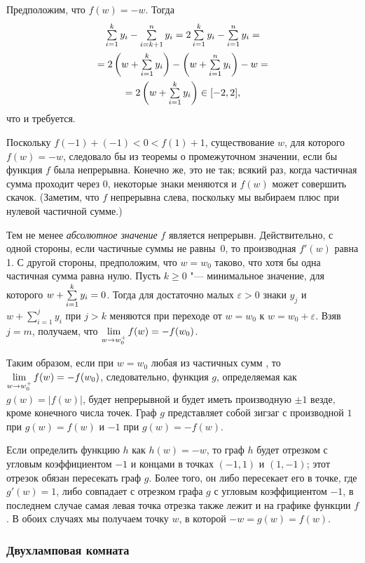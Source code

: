 \documentclass[twoside]{book}
\begin{document}
Предположим, что $f(w)=-w$.
Тогда
\begin{multline*}
\mathop{\textstyle\sum}\limits_{i=1}^{k}y_i-\mathop{\textstyle\sum}\limits_{i=k+1}^{n}y_i=
2\mathop{\textstyle\sum}\limits_{i=1}^{k}y_i-\mathop{\textstyle\sum}\limits_{i=1}^{n}y_i=\\=
2\left(w+\mathop{\textstyle\sum}\limits_{i=1}^{k}y_i\right)-\left(w+\mathop{\textstyle\sum}\limits_{i=1}^{n}y_i\right)-w=\\=
2\left(w+\mathop{\textstyle\sum}\limits_{i=1}^{k}y_i\right)\in[-2,2],
\end{multline*}
что и требуется.

Поскольку $f(-1)+(-1)<0<f(1)+1$, существование $w$, для которого $f(w)=-w$, следовало бы из теоремы о промежуточном значении, если бы функция $f$ была непрерывна.
Конечно же, это не так; всякий раз, когда частичная сумма проходит через 0, некоторые знаки меняются и $f(w)$ может совершить скачок.
(Заметим, что $f$ непрерывна слева, поскольку мы выбираем плюс при нулевой частичной сумме.)

Тем не менее \emph{абсолютное значение} $f$ является непрерывн.
Действительно, с одной стороны, если частичные суммы не равны~$0$, то производная $f'(w)$ равна 1.
С другой стороны, предположим, что $w=w_0$ таково, что хотя бы одна частичная сумма равна нулю.
Пусть $k\ge0$ "--- минимальное значение, для которого $w+\sum\limits_{i=1}^{k}y_i\z=0$.
Тогда для достаточно малых $\varepsilon>0$
знаки  $y_j$ и $w+\sum\limits_{i=1}^{j}y_i$ при $j>k$ меняются при переходе от $w=w_0$ к $w=w_0+\varepsilon$.
Взяв $j = m$, получаем, что $\lim\limits_{w\to w_0^+}f(w)\z=-f(w_0)$.

Таким образом, если при $w=w_0$ любая из частичных сумм , то $\lim\limits_{w\to w_0^+}f(w)\z=-f(w_0)$, следовательно, функция $g$, определяемая как $g(w) =|f(w)|$, будет непрерывной и будет иметь производную $\pm1$ везде, кроме конечного числа точек.
Граф $g$ представляет собой зигзаг с производной $1$ при $g(w)=f(w)$ и $-1$ при $g(w)=-f(w)$.

Если определить функцию $h$ как $h (w) = -w$, то граф $h$ будет отрезком с угловым коэффициентом $-1$ и концами в точках $(-1,1)$ и $(1,-1)$;
этот отрезок обязан пересекать граф $g$.
Более того, он либо пересекает его в точке, где $g'(w) = 1$, либо совпадает с отрезком графа $g$ с угловым коэффициентом $-1$, в последнем случае самая левая точка отрезка также лежит и на графике функции $f$.
В обоих случаях мы получаем точку $w$, в которой $-w = g (w) = f (w)$.
\heart

\subsubsection*{Двухламповая комната}
\end{document}
